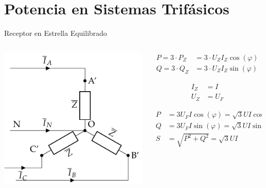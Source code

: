 \documentclass[aspectratio=169, usenames,svgnames,dvipsnames]{beamer}
\begin{document}
\section{Potencia en Sistemas Trifásicos}
\label{sec:org920afc7}

\begin{frame}[label={sec:org5fde7aa}]{Receptor en Estrella Equilibrado}
\begin{columns}
\begin{column}{0.5\columnwidth}
\begin{center}
\includegraphics[width=.9\linewidth]{../figs/EstrellaEquilibrado_Receptor.pdf}
\end{center}
\end{column}

\begin{column}{0.5\columnwidth}
\begin{align*}
  P = 3 \cdot P_Z &= 3 \cdot U_Z I_Z \cos(\varphi)\\
  Q = 3 \cdot Q_Z &= 3 \cdot U_Z I_Z \sin(\varphi)
\end{align*}

\begin{align*}
  I_Z &= I\\
  U_Z &= U_F
\end{align*}


\begin{align*}
  P &= 3 U_F I \cos(\varphi) = \sqrt{3} U I \cos(\varphi)\\
  Q &= 3 U_F I \sin(\varphi) = \sqrt{3} U I \sin(\varphi)\\
  S &= \sqrt{P^2 + Q^2} =  \sqrt{3} U I
\end{align*}
\end{column}
\end{columns}
\end{frame}
\end{document}
